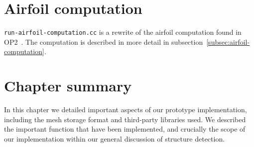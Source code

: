 \section{Airfoil computation}
\texttt{run-airfoil-computation.cc} is a rewrite of the airfoil computation found in OP2~\cite{op2airfoil}. The computation is described in more detail in subsection~\ref{subsec:airfoil-computation}.


\section{Chapter summary}
In this chapter we detailed important aspects of our prototype implementation, including the mesh storage format and third-party libraries used. We described the important function that have been implemented, and crucially the scope of our implementation within our general discussion of structure detection.
